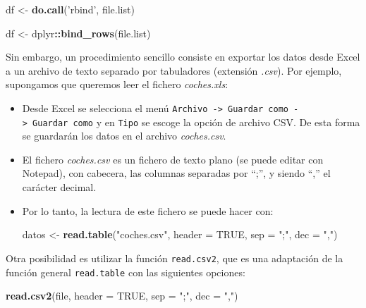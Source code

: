 \documentclass[]{book}
\newenvironment{Shaded}{\begin{snugshade}}{\end{snugshade}}
\newcommand{\KeywordTok}[1]{\textcolor[rgb]{0.13,0.29,0.53}{\textbf{#1}}}
\newcommand{\DataTypeTok}[1]{\textcolor[rgb]{0.13,0.29,0.53}{#1}}
\newcommand{\StringTok}[1]{\textcolor[rgb]{0.31,0.60,0.02}{#1}}
\newcommand{\OtherTok}[1]{\textcolor[rgb]{0.56,0.35,0.01}{#1}}
\newcommand{\OperatorTok}[1]{\textcolor[rgb]{0.81,0.36,0.00}{\textbf{#1}}}
\newcommand{\NormalTok}[1]{#1}
\begin{document}
\begin{Shaded}
\begin{Highlighting}[]
\NormalTok{df <-}\StringTok{ }\KeywordTok{do.call}\NormalTok{(}\StringTok{'rbind'}\NormalTok{, file.list)}

\NormalTok{df <-}\StringTok{ }\NormalTok{dplyr}\OperatorTok{::}\KeywordTok{bind_rows}\NormalTok{(file.list)}
\end{Highlighting}
\end{Shaded}

Sin embargo, un procedimiento sencillo consiste en exportar los datos
desde Excel a un archivo de texto separado por tabuladores (extensión
\emph{.csv}). Por ejemplo, supongamos que queremos leer el fichero
\emph{coches.xls}:

\begin{itemize}
\item
  Desde Excel se selecciona el menú
  \texttt{Archivo\ -\textgreater{}\ Guardar\ como\ -\textgreater{}\ Guardar\ como}
  y en \texttt{Tipo} se escoge la opción de archivo CSV. De esta forma
  se guardarán los datos en el archivo \emph{coches.csv}.
\item
  El fichero \emph{coches.csv} es un fichero de texto plano (se puede
  editar con Notepad), con cabecera, las columnas separadas por ``;'', y
  siendo ``,'' el carácter decimal.
\item
  Por lo tanto, la lectura de este fichero se puede hacer con:

\begin{Shaded}
\begin{Highlighting}[]
\NormalTok{datos <-}\StringTok{ }\KeywordTok{read.table}\NormalTok{(}\StringTok{"coches.csv"}\NormalTok{, }\DataTypeTok{header =} \OtherTok{TRUE}\NormalTok{, }\DataTypeTok{sep =} \StringTok{";"}\NormalTok{, }\DataTypeTok{dec =} \StringTok{","}\NormalTok{)}
\end{Highlighting}
\end{Shaded}
\end{itemize}

Otra posibilidad es utilizar la función \texttt{read.csv2}, que es una
adaptación de la función general \texttt{read.table} con las siguientes
opciones:

\begin{Shaded}
\begin{Highlighting}[]
\KeywordTok{read.csv2}\NormalTok{(file, }\DataTypeTok{header =} \OtherTok{TRUE}\NormalTok{, }\DataTypeTok{sep =} \StringTok{";"}\NormalTok{, }\DataTypeTok{dec =} \StringTok{","}\NormalTok{)}
\end{Highlighting}
\end{Shaded}
\end{document}
